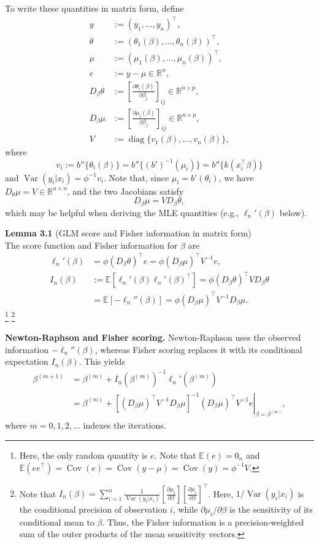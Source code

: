 \documentclass{article}
\theoremstyle{break}
\newcommand{\R}{\ensuremath{\mathbb{R}}}
\newcommand{\E}{\ensuremath{\mathbb{E}}}
\DeclareMathOperator{\Var}{Var}
\DeclareMathOperator{\Cov}{Cov}
\DeclareMathOperator{\diag}{diag}
\begin{document}
To write these quantities in matrix form, define
\begin{align*}
  y &:= (y_1,\ldots,y_n)^\top, \\
  \theta &:= (\theta_1(\beta),\ldots,\theta_n(\beta))^\top, \\
  \mu &:= (\mu_1(\beta),\ldots,\mu_n(\beta))^\top, \\
  e &:= y - \mu \in \R^n, \\
  D_\beta\theta
  &:=\left[\frac{\partial\theta_i(\beta)}{\partial\beta_j}\right]_{
  ij}
  \in\R^{n\times p}, \\
  D_\beta\mu
  &:=\left[\frac{\partial\mu_i(\beta)}{\partial\beta_j}\right]_{
  ij}
  \in\R^{n\times p}, \\
  V &:= \diag\{v_1(\beta),\ldots,v_n(\beta)\},
\end{align*}
where
\[
  v_i:=b''\{\theta_i(\beta)\}
  =b''\{(b')^{-1}(\mu_i)\}
  =b''\{k(x_i^\top\beta)\}
\]
and $\Var(y_i | x_i)=\phi^{-1}v_i$. 
Note that, since $\mu_i=b'(\theta_i)$, we have $D_\theta\mu=V\in\R^{n\times n}$, and the two Jacobians satisfy
\[
  D_\beta\mu=V D_\beta\theta,
\]
which may be helpful when deriving the MLE quantities (e.g., $\ell_n'(\beta)$ below).

\textbf{Lemma 3.1} (GLM score and Fisher information in matrix form) \\
The score function and Fisher information for $\beta$ are
\begin{align*}
  \ell_n'(\beta)
  &=\phi(D_\beta\theta)^\top e
  =\phi(D_\beta\mu)^\top V^{-1}e, \\
  I_n(\beta)
  &:=\E[\ell_n'(\beta)\ell_n'(\beta)^\top]
  =\phi(D_\beta\theta)^\top V D_\beta\theta \\
  &=\E[-\ell_n''(\beta)]
  =\phi(D_\beta\mu)^\top V^{-1} D_\beta\mu.
\end{align*}
\footnote{
    Here, the only random quantity is $e$. Note that $\E(e)=0_n$ and $\E(ee^\top)=\Cov(e)=\Cov(y-\mu)=\Cov(y)=\phi^{-1}V$.
}
\footnote{
    Note that $I_n(\beta) =\sum_{i=1}^n \frac{1}{\Var(y_i | x_i)} \left[\frac{\partial\mu_i}{\partial\beta}\right] \left[\frac{\partial\mu_i}{\partial\beta}\right]^\top$.
    Here, $1/\Var(y_i | x_i)$ is the conditional precision of observation $i$, while $\partial\mu_i/\partial\beta$ is the sensitivity of its conditional mean to $\beta$. Thus, the Fisher information is a precision-weighted sum of the outer products of the mean sensitivity vectors.
}

\textbf{Newton-Raphson and Fisher scoring.}
Newton-Raphson uses the observed information $-\ell_n''(\beta)$, whereas Fisher scoring replaces it with its conditional expectation $I_n(\beta)$. This yields
\begin{align*}
  \beta^{(m+1)}
  &=\beta^{(m)}
  +I_n(\beta^{(m)})^{-1}\ell_n'(\beta^{(m)}) \\
  &=\beta^{(m)}
  +\left.
  \left[(D_\beta\mu)^\top V^{-1} D_\beta\mu\right]^{-1}
  (D_\beta\mu)^\top V^{-1}e
  \right|_{\beta=\beta^{(m)}},
\end{align*}
where $m=0,1,2,\ldots$ indexes the iterations.
\end{document}
